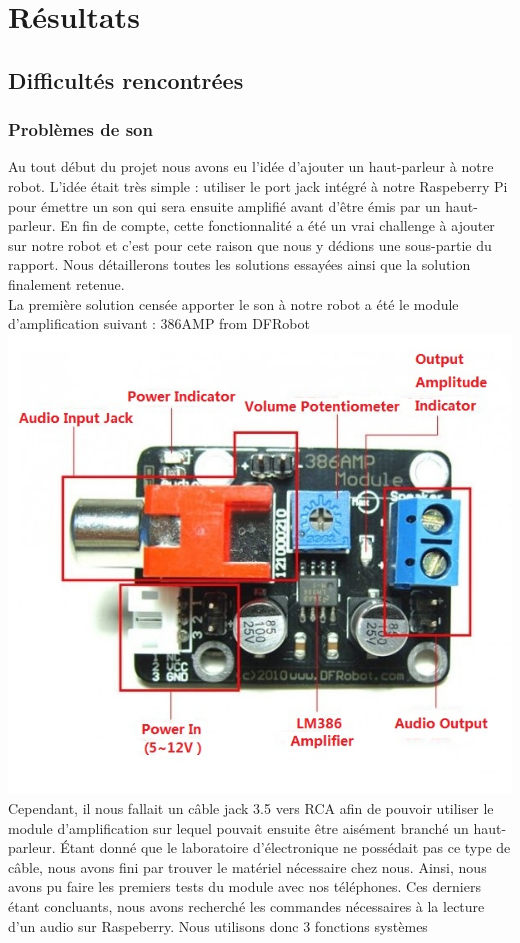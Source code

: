 \documentclass[a4paper, 12pt]{report}
\begin{document}
\chapter{Résultats}
\lipsum[7-8]
\section{Difficultés rencontrées}
\subsection{Problèmes de son}
Au tout début du projet nous avons eu l'idée d'ajouter un haut-parleur à notre robot. L'idée était très simple : utiliser le port jack intégré à notre Raspeberry Pi pour émettre un son qui sera ensuite amplifié avant d'être émis par un haut-parleur. En fin de compte, cette fonctionnalité a été un vrai challenge à ajouter sur notre robot et c'est pour cete raison que nous y dédions une sous-partie du rapport. Nous détaillerons toutes les solutions essayées ainsi que la solution finalement retenue.
\\
La première solution censée apporter le son à notre robot a été le module d'amplification suivant : 386AMP from DFRobot
\\
\includegraphics[scale=0.5]{386AMP.jpg}
\\
Cependant, il nous fallait un câble jack 3.5 vers RCA afin de pouvoir utiliser le module d'amplification sur lequel pouvait ensuite être aisément branché un haut-parleur. Étant donné que le laboratoire d'électronique ne possédait pas ce type de câble, nous avons fini par trouver le matériel nécessaire chez nous. Ainsi, nous avons pu faire les premiers tests du module avec nos téléphones. Ces derniers étant concluants, nous avons recherché les commandes nécessaires à la lecture d'un audio sur Raspeberry. Nous utilisons donc 3 fonctions systèmes
\end{document}
